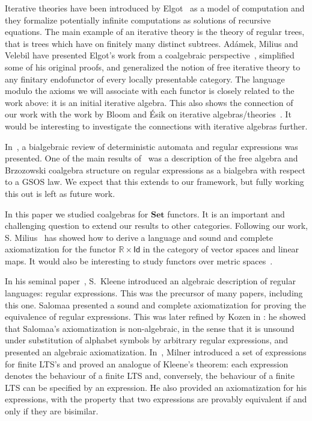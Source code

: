 \documentclass{LMCS}
\newcommand\id{\mathsf{Id}}
\theoremstyle{definition}
\theoremstyle{plain}
\theoremstyle{plain}
\theoremstyle{plain}
\theoremstyle{plain}
\theoremstyle{definition}
\theoremstyle{definition}
\begin{document}
Iterative theories have been introduced by Elgot~\cite{elgot} as a model of
computation and they formalize potentially infinite computations as
solutions of recursive equations. The main example of an iterative theory is the theory of
regular trees, that is trees which have on finitely many distinct
subtrees. Ad\'amek, Milius and Velebil have presented Elgot's work
from a coalgebraic perspective~\cite{AMV03,adamekmscs2006}, simplified
some of his original proofs, and generalized the notion of free
iterative theory to any finitary endofunctor of every locally
presentable category. The language modulo the axioms we will associate
with each functor is closely related to the work above: it is an 
initial iterative algebra. This also shows the connection of our work with the
work by Bloom and \'Esik on iterative algebras/theories~\cite{BE93}.
 It would be
interesting to investigate the connections with iterative
algebras further. 

In~\cite{jacobs06}, a bialgebraic review of deterministic automata and
regular expressions was presented. One of the main results of~\cite{jacobs06}
was a description of the free algebra and Brzozowski coalgebra
structure on regular expressions as a bialgebra with respect to a GSOS
law. We expect that this extends to our framework, but fully working this out is left as future
work. 

In this paper we studied coalgebras for $\mathbf{Set}$ functors. It is
an important and challenging question to extend our results to other
categories. Following our work, S. Milius~\cite{milius:lics10} has 
showed how to derive a language and sound and complete
axiomatization for the functor $\mathbb R \times \id$ in the category
of vector spaces and linear maps. It would also be interesting to study functors
over metric spaces~\cite{TuriR98,BreugelW06}.

In his seminal paper~\cite{kleene}, S.~Kleene introduced an
algebraic description of regular languages: regular expressions. This
was the precursor of many papers, including this one. Salomaa \cite{salomaa} presented a sound and complete axiomatization
for proving the equivalence of regular expressions. This was later
refined by Kozen in \cite{kozen}: he showed that Salomaa's
axiomatization is non-algebraic, in the sense that it is unsound under
substitution of alphabet symbols by arbitrary regular expressions, and
presented an algebraic axiomatization. In~\cite{milner}, Milner
introduced a set of expressions for finite LTS's and proved an
analogue of Kleene's theorem: each expression denotes the behaviour
of a finite LTS and, conversely, the behaviour of a finite LTS can
be specified by an expression. He also provided an axiomatization for his expressions, with the property that two expressions are provably equivalent if and only if they are bisimilar.
\end{document}
